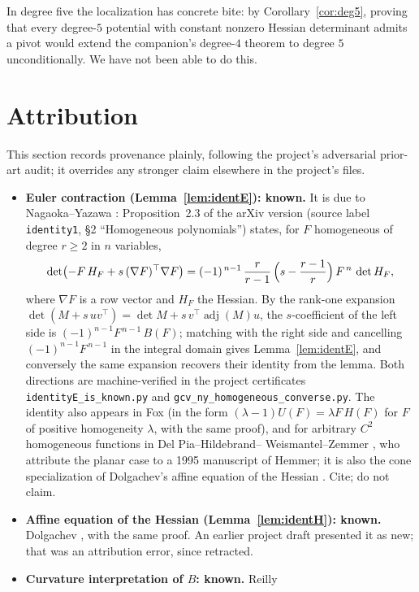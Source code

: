 \documentclass[11pt]{article}
\theoremstyle{plain}
\theoremstyle{definition}
\newcommand{\adj}{\operatorname{adj}}
\begin{document}
In degree five the localization has concrete bite: by
Corollary~\ref{cor:deg5}, proving that every degree-$5$ potential with
constant nonzero Hessian determinant admits a pivot would extend the
companion's degree-$4$ theorem to degree $5$ unconditionally. We have
not been able to do this.

\section{Attribution}\label{sec:attribution}

This section records provenance plainly, following the project's
adversarial prior-art audit; it overrides any stronger claim elsewhere
in the project's files.

\begin{itemize}
\item\textbf{Euler contraction (Lemma~\ref{lem:identE}): known.} It is
due to Nagaoka--Yazawa \cite{NY}: Proposition~2.3 of the arXiv version
(source label \texttt{identity1}, \S2 ``Homogeneous polynomials'')
states, for $F$ homogeneous of degree $r\ge2$ in $n$ variables,
\[
\det\bigl(-F\,H_F+s\,(\nabla F)^{\top}\nabla F\bigr)
=(-1)^{\,n-1}\,\frac{r}{r-1}\,\Bigl(s-\frac{r-1}{r}\Bigr)\,F^{\,n}\,
\det H_F ,
\]
where $\nabla F$ is a row vector and $H_F$ the Hessian. By the rank-one
expansion $\det(M+s\,uv^{\top})=\det M+s\,v^{\top}\adj(M)u$, the
$s$-coefficient of the left side is $(-1)^{n-1}F^{\,n-1}\,B(F)$;
matching with the right side and cancelling $(-1)^{n-1}F^{\,n-1}$ in the
integral domain gives Lemma~\ref{lem:identE}, and conversely the same
expansion recovers their identity from the lemma. Both directions are
machine-verified in the project certificates
\texttt{identityE\_is\_known.py} and
\texttt{gcv\_ny\_homogeneous\_converse.py}. The identity also appears in
Fox \cite{Fox2017} (in the form $(\lambda-1)U(F)=\lambda F\,H(F)$ for $F$
of positive homogeneity $\lambda$, with the same proof), and for
arbitrary $C^2$ homogeneous functions in Del Pia--Hildebrand--%
Weismantel--Zemmer \cite[Lemma 5.2]{DHWZ}, who attribute the planar case
to a 1995 manuscript of Hemmer; it is also the cone specialization of
Dolgachev's affine equation of the Hessian \cite{Dolgachev}. Cite; do
not claim.
\item\textbf{Affine equation of the Hessian (Lemma~\ref{lem:identH}):
known.} Dolgachev \cite[\S1.1.4, (1.20)--(1.21)]{Dolgachev}, with the
same proof. An earlier project draft presented it as new; that was an
attribution error, since retracted.
\item\textbf{Curvature interpretation of $B$: known.} Reilly

\end{itemize}
\end{document}
